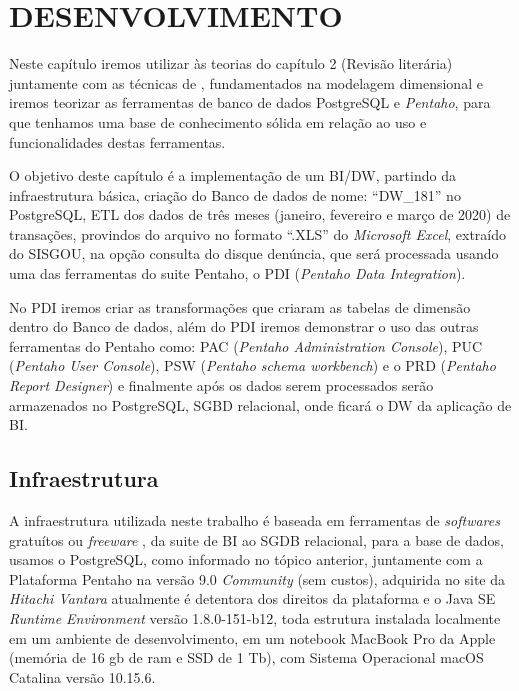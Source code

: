 %
%

\chapter{DESENVOLVIMENTO}

Neste cap\'{i}tulo iremos utilizar \`{a}s teorias do cap\'{i}tulo 2 (Revis\~{a}o liter\'{a}ria) juntamente com as t\'{e}cnicas de \cite{dw-kimball-2013}, fundamentados na modelagem dimensional e iremos teorizar as ferramentas de banco de dados PostgreSQL e \textit{Pentaho}, para que tenhamos uma base de conhecimento s\'olida em rela\c{c}\~{a}o ao uso e funcionalidades destas ferramentas.

O objetivo deste cap\'{i}tulo \'{e} a implementa\c{c}\~{a}o de um BI/DW, partindo da infraestrutura b\'{a}sica, cria\c{c}\~{a}o do Banco de dados de nome: ``DW\_181'' no PostgreSQL, ETL dos dados de três meses  (janeiro, fevereiro e mar\c{c}o de 2020) de transa\c{c}\~{o}es, provindos do arquivo no formato ``.XLS'' do \textit{Microsoft Excel},  extra\'{i}do do SISGOU, na op\c{c}\~{a}o consulta do disque denúncia, que ser\'{a} processada usando uma das ferramentas do suite Pentaho, o PDI (\textit{Pentaho Data Integration}).

No PDI iremos criar as transforma\c{c}\~{o}es que criaram as tabelas de dimens\~{a}o dentro do Banco de dados, al\'{e}m do PDI iremos demonstrar o uso das outras ferramentas do Pentaho como: PAC (\textit{Pentaho Administration Console}), PUC (\textit{Pentaho User Console}), PSW (\textit{Pentaho schema workbench}) e o PRD (\textit{Pentaho Report Designer}) e finalmente ap\'os os dados serem processados ser\~{a}o armazenados no PostgreSQL, SGBD relacional, onde ficar\'{a} o DW da aplica\c{c}\~{a}o de BI.

\section{Infraestrutura}

A infraestrutura utilizada neste trabalho \'{e} baseada em ferramentas de \textit{softwares} gratu\'{i}tos ou \textit{freeware} , da suite de BI ao SGDB relacional, para a base de dados, usamos o PostgreSQL, como informado no t\'opico anterior, juntamente com a Plataforma Pentaho na vers\~{a}o 9.0 \textit{Community} (sem custos), adquirida no site da \textit{Hitachi Vantara} atualmente \'{e} detentora dos direitos da plataforma e o Java SE \textit{Runtime Environment} vers\~{a}o 1.8.0-151-b12, toda estrutura instalada localmente em um ambiente de desenvolvimento, em um notebook MacBook Pro da Apple (mem\'oria de 16 gb de ram e SSD de 1 Tb), com Sistema Operacional macOS Catalina vers\~{a}o 10.15.6.

